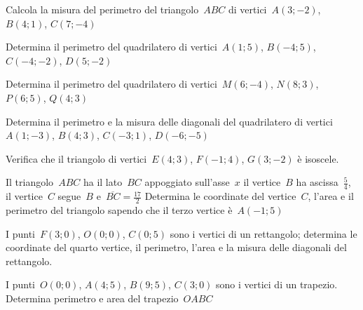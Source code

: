 \begin{esercizio}
\label{ese:D.24}
Calcola la misura del perimetro del triangolo~$ABC$ di vertici~$A(3;-2)$, $B(4;1)$, $C(7;-4)$
\end{esercizio}

\begin{esercizio}
\label{ese:D.25}
Determina il perimetro del quadrilatero di vertici~$A(1;5)$, $B(-4;5)$, $C(-4;-2)$, $D(5;-2)$
\end{esercizio}

\begin{esercizio}
\label{ese:D.26}
Determina il perimetro del quadrilatero di vertici~$M(6;-4)$, $N(8;3)$, $P(6;5)$, $Q(4;3)$
\end{esercizio}

\begin{esercizio}
\label{ese:D.27}
Determina il perimetro e la misura delle diagonali del quadrilatero di vertici~$A(1;-3)$, $B(4;3)$, $C(-3;1)$, $D(-6;-5)$
\end{esercizio}

\begin{esercizio}
\label{ese:D.28}
Verifica che il triangolo di vertici~$E(4;3)$, $F(-1;4)$, $G(3;-2)$ è isoscele.
\end{esercizio}

\begin{esercizio}
\label{ese:D.29}
Il triangolo~$ABC$ ha il lato~$BC$ appoggiato sull'asse~$x$ il vertice~$B$ ha ascissa~$\frac{5}{4}$,
il vertice~$C$ segue~$B$ e~$\overline{BC}=\frac{17}{2}$ Determina le coordinate del vertice~$C$,
l'area e il perimetro del triangolo sapendo che il terzo vertice è~$A(-1;5)$
\end{esercizio}

\begin{esercizio}
\label{ese:D.30}
I punti~$F(3;0)$, $O(0;0)$, $C(0;5)$ sono i vertici di un rettangolo; determina le coordinate del quarto vertice, il perimetro,
l'area e la misura delle diagonali del rettangolo.
\end{esercizio}

\begin{esercizio}
\label{ese:D.31}
I punti~$O(0;0)$, $A(4;5)$, $B(9;5)$, $C(3;0)$ sono i vertici di un trapezio.
Determina perimetro e area del trapezio~$OABC$
\end{esercizio}

